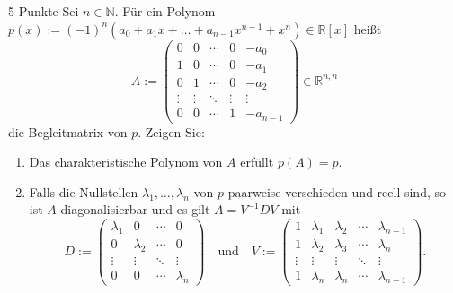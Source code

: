 \documentclass{problemset}
\begin{document}
\begin{problem}{5 Punkte}
Sei $n \in \mathbb{N}$. Für ein Polynom $p(x) := (-1)^n(a_0 + a_1x + \dots + a_{n-1}x^{n-1} + x^n) \in \mathbb{R}[x]$ heißt
\[ A := \begin{pmatrix}
        0      & 0      & \cdots & 0      & -a_0     \\
        1      & 0      & \cdots & 0      & -a_1     \\
        0      & 1      & \cdots & 0      & -a_2     \\
        \vdots & \vdots & \ddots & \vdots & \vdots   \\
        0      & 0      & \cdots & 1      & -a_{n-1}
    \end{pmatrix} \in \mathbb{R}^{n,n} \]
die Begleitmatrix von $p$. Zeigen Sie:
\begin{enumerate}
    \item Das charakteristische Polynom von $A$ erfüllt $p(A) = p$.
    \item Falls die Nullstellen $\lambda_1, \dots, \lambda_n$ von $p$ paarweise
          verschieden und reell sind, so ist $A$ diagonalisierbar und es gilt
          $A = V^{-1}DV$ mit
          \[ D := \begin{pmatrix}
                  \lambda_1 & 0         & \cdots & 0         \\
                  0         & \lambda_2 & \cdots & 0         \\
                  \vdots    & \vdots    & \ddots & \vdots    \\
                  0         & 0         & \cdots & \lambda_n
              \end{pmatrix} \quad \text{und} \quad V := \begin{pmatrix}
                  1      & \lambda_1 & \lambda_2 & \cdots & \lambda_{n-1} \\
                  1      & \lambda_2 & \lambda_3 & \cdots & \lambda_{n}   \\
                  \vdots & \vdots    & \vdots    & \ddots & \vdots        \\
                  1      & \lambda_n & \lambda_n & \cdots & \lambda_{n-1}
              \end{pmatrix}.
          \]
\end{enumerate}
\end{problem}
\end{document}
